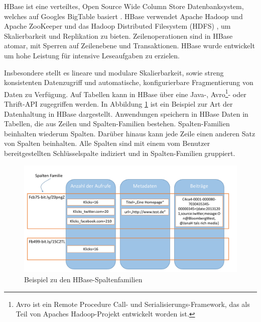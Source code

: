 HBase ist eine verteiltes, Open Source Wide Column Store Datenbanksystem, welches auf Googles BigTable basiert \cite{Chang:2006:BDS:1267308.1267323}. HBase verwendet Apache Hadoop und Apache ZooKeeper  \cite{Hunt:2010:ZWC:1855840.1855851} und das Hadoop Distributed Filesystem (HDFS) \cite{Shvachko:2010:HDF:1913798.1914427}, um Skalierbarkeit und Replikation zu bieten. Zeilenoperationen sind in HBase atomar, mit Sperren auf Zeilenebene und Transaktionen. HBase wurde entwickelt um hohe Leistung für intensive Leseaufgaben zu erzielen.

Insbesondere stellt es lineare und modulare Skalierbarkeit, sowie streng konsistenten Datenzugriff und automatische, konfigurierbare Fragmentierung von Daten zu Verfügung. Auf Tabellen kann in HBase über eine Java-, Avro\footnote{Avro ist ein Remote Procedure Call- und Serialisierungs-Framework, das als Teil von Apaches Hadoop-Projekt entwickelt worden ist.}- oder Thrift-API zugegriffen werden. In Abbildung \ref{db_hbase} ist ein Beispiel zur Art der Datenhaltung in HBase dargestellt. Anwendungen speichern in HBase Daten in Tabellen, die aus Zeilen und Spalten-Familien bestehen. Spalten-Familien beinhalten wiederum Spalten. Darüber hinaus kann jede Zeile einen anderen Satz von Spalten beinhalten. Alle Spalten sind mit einem vom Benutzer bereitgestellten Schlüsselspalte indiziert und in Spalten-Familien gruppiert.

\begin{figure}[htbp]
\centering
  \includegraphics[width=1.0\textwidth, width=1.0\textwidth]{pics/HBase.pdf}
\caption{Beispiel zu den HBase-Spaltenfamilien}
\label{db_hbase}
\end{figure} 

